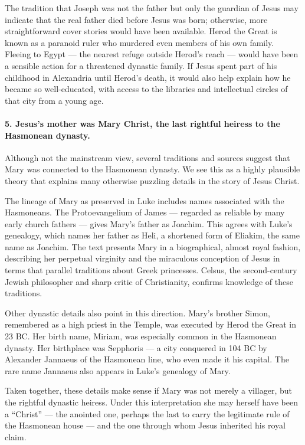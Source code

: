 The tradition that Joseph was not the father but only the guardian of Jesus may indicate that the real father died before Jesus was born; otherwise, more straightforward cover stories would have been available.
Herod the Great is known as a paranoid ruler who murdered even members of his own family.
Fleeing to Egypt — the nearest refuge outside Herod’s reach — would have been a sensible action for a threatened dynastic family.
If Jesus spent part of his childhood in Alexandria until Herod’s death, it would also help explain how he became so well-educated, with access to the libraries and intellectual circles of that city from a young age.

\paragraph{5.
Jesus's mother was Mary Christ, the last rightful heiress to the Hasmonean dynasty.}\label{par:jesuss-mother-was-mary-christ-the-last-rightful-heiress-to-the-hasmonean-dynasty.}

Although not the mainstream view, several traditions and sources suggest that Mary was connected to the Hasmonean dynasty.
We see this as a highly plausible theory that explains many otherwise puzzling details in the story of Jesus Christ.

The lineage of Mary as preserved in Luke includes names associated with the Hasmoneans.
The Protoevangelium of James — regarded as reliable by many early church fathers — gives Mary’s father as Joachim.
This agrees with Luke’s genealogy, which names her father as Heli, a shortened form of Eliakim, the same name as Joachim.
The text presents Mary in a biographical, almost royal fashion, describing her perpetual virginity and the miraculous conception of Jesus in terms that parallel traditions about Greek princesses.
Celsus, the second-century Jewish philosopher and sharp critic of Christianity, confirms knowledge of these traditions.

Other dynastic details also point in this direction.
Mary’s brother Simon, remembered as a high priest in the Temple, was executed by Herod the Great in 23 BC.
Her birth name, Miriam, was especially common in the Hasmonean dynasty.
Her birthplace was Sepphoris — a city conquered in 104 BC by Alexander Jannaeus of the Hasmonean line, who even made it his capital.
The rare name Jannaeus also appears in Luke’s genealogy of Mary.

Taken together, these details make sense if Mary was not merely a villager, but the rightful dynastic heiress.
Under this interpretation she may herself have been a “Christ” — the anointed one, perhaps the last to carry the legitimate rule of the Hasmonean house — and the one through whom Jesus inherited his royal claim.


